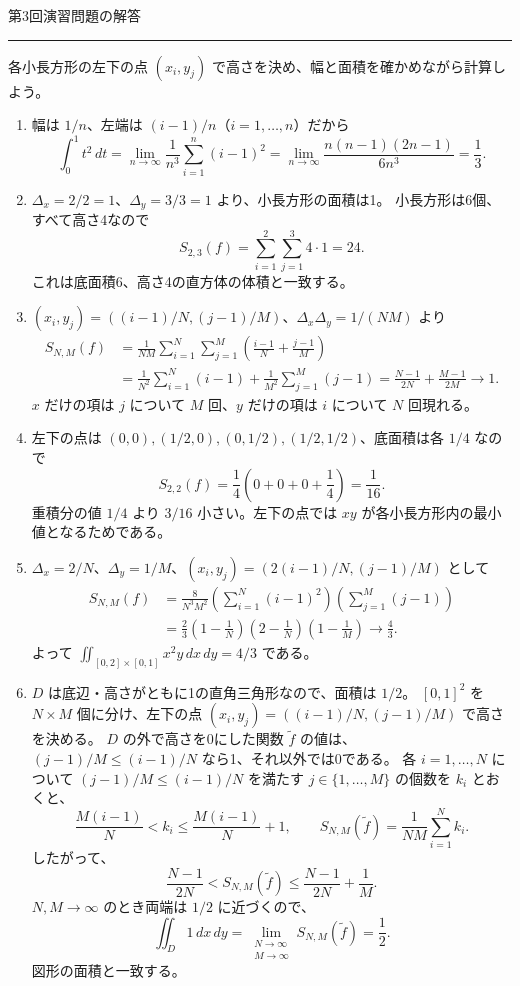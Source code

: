 \documentclass[a4paper,10pt,pdflatex,ja=standard,jafont=ipaex-type1,
  magstyle=real,scale=1]{bxjsarticle}
\newcommand{\handouttitle}[1]{%
  \begin{center}
    {\Large\color{ink}#1}\par\vspace{3mm}
    {\color{accent}\rule{0.88\linewidth}{0.7pt}}
  \end{center}\vspace{-2mm}}
\newenvironment{problems}
  {\begin{enumerate}[leftmargin=2em,itemsep=3pt,topsep=3pt,parsep=0pt,
    font=\color{accent}]}
  {\end{enumerate}}
\begin{document}
\newpage
\handouttitle{第3回\quad 演習問題の解答}
{\small 各小長方形の左下の点 $(x_i,y_j)$ で高さを決め、幅と面積を確かめながら計算しよう。}\par
\begin{problems}
\setlength{\itemsep}{7pt}
\item 幅は $1/n$、左端は $(i-1)/n$（$i=1,\ldots,n$）だから
$$
 \int_0^1t^2\,dt
 =\lim_{n\to\infty}\frac1{n^3}\sum_{i=1}^n(i-1)^2
 =\lim_{n\to\infty}\frac{n(n-1)(2n-1)}{6n^3}=\frac13.
$$

\item $\Delta_x=2/2=1$、$\Delta_y=3/3=1$ より、小長方形の面積は1。
小長方形は6個、すべて高さ4なので
$$
 S_{2,3}(f)=\sum_{i=1}^2\sum_{j=1}^3 4\cdot1=24.
$$
これは底面積6、高さ4の直方体の体積と一致する。

\item $(x_i,y_j)=((i-1)/N,(j-1)/M)$、$\Delta_x\Delta_y=1/(NM)$ より
$$
 \begin{aligned}
 S_{N,M}(f)
 &=\frac1{NM}\sum_{i=1}^N\sum_{j=1}^M\left(\frac{i-1}{N}+\frac{j-1}{M}\right)\\
 &=\frac1{N^2}\sum_{i=1}^N(i-1)+\frac1{M^2}\sum_{j=1}^M(j-1)
 =\frac{N-1}{2N}+\frac{M-1}{2M}\longrightarrow1.
 \end{aligned}
$$
$x$ だけの項は $j$ について $M$ 回、$y$ だけの項は $i$ について $N$ 回現れる。

\item 左下の点は $(0,0),(1/2,0),(0,1/2),(1/2,1/2)$、底面積は各 $1/4$ なので
$$
 S_{2,2}(f)=\frac14\left(0+0+0+\frac14\right)=\frac1{16}.
$$
重積分の値 $1/4$ より $3/16$ 小さい。左下の点では $xy$ が各小長方形内の最小値となるためである。

\item $\Delta_x=2/N$、$\Delta_y=1/M$、$(x_i,y_j)=(2(i-1)/N,(j-1)/M)$ として
$$
 \begin{aligned}
 S_{N,M}(f)
 &=\frac8{N^3M^2}
   \left(\sum_{i=1}^N(i-1)^2\right)\left(\sum_{j=1}^M(j-1)\right)\\
 &=\frac23\left(1-\frac1N\right)\left(2-\frac1N\right)
   \left(1-\frac1M\right)\longrightarrow\frac43.
 \end{aligned}
$$
よって $\iint_{[0,2]\times[0,1]}x^2y\,dx\,dy=4/3$ である。

\item $D$ は底辺・高さがともに1の直角三角形なので、面積は $1/2$。
$[0,1]^2$ を $N\times M$ 個に分け、左下の点 $(x_i,y_j)=((i-1)/N,(j-1)/M)$ で高さを決める。
$D$ の外で高さを0にした関数 $\widetilde f$ の値は、$(j-1)/M\le(i-1)/N$ なら1、それ以外では0である。
各 $i=1,\ldots,N$ について $(j-1)/M\le(i-1)/N$ を満たす $j\in\{1,\ldots,M\}$ の個数を $k_i$ とおくと、
$$
 \frac{M(i-1)}{N}<k_i\le\frac{M(i-1)}{N}+1,\qquad
 S_{N,M}(\widetilde f)=\frac1{NM}\sum_{i=1}^N k_i.
$$
したがって、
$$
 \frac{N-1}{2N}
 <S_{N,M}(\widetilde f)\le\frac{N-1}{2N}+\frac1M.
$$
$N,M\to\infty$ のとき両端は $1/2$ に近づくので、
$$
 \iint_D1\,dx\,dy
 =\lim_{\substack{N\to\infty\\M\to\infty}}S_{N,M}(\widetilde f)
 =\frac12.
$$
図形の面積と一致する。
\end{problems}
\end{document}
